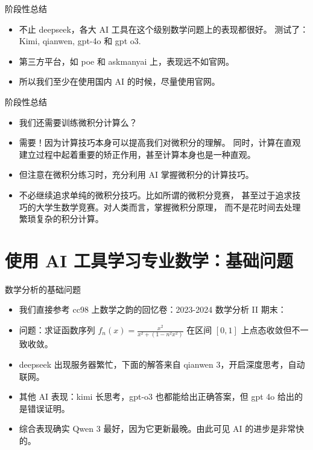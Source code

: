 \documentclass{beamer}
\begin{document}
\begin{frame}{阶段性总结}
\begin{itemize}
  \item<1-> 不止 deepseek，各大 AI 工具在这个级别数学问题上的表现都很好。
  测试了：Kimi, qianwen, gpt-4o 和 gpt o3.
  \item<2-> 第三方平台，如 poe 和 askmanyai 上，表现远不如官网。
  \item<3-> {\color{red}所以我们至少在使用国内 AI 的时候，尽量使用官网。}
\end{itemize}
\end{frame}

\begin{frame}{阶段性总结}
  \begin{itemize}
    \item<1-> 我们还需要训练微积分计算么？
    \item<2-> 需要！因为计算技巧本身可以提高我们对微积分的理解。
    同时，计算在直观建立过程中起着重要的矫正作用，甚至计算本身也是一种直观。
    \item<3-> 但注意在微积分练习时，充分利用 AI 掌握微积分的计算技巧。
    \item<4-> 不必继续追求单纯的微积分技巧。比如所谓的微积分竞赛，
    甚至过于追求技巧的大学生数学竞赛。对人类而言，掌握微积分原理，
    而不是花时间去处理繁琐复杂的积分计算。
  \end{itemize}
\end{frame}

\section{使用 AI 工具学习专业数学：基础问题}

\begin{frame}{数学分析的基础问题}
  \begin{itemize}
    \item<1-> 我们直接参考 cc98 上数学之韵的回忆卷：2023-2024 数学分析 II 期末：
    \item<2-> 问题：求证函数序列 $f_n(x) = \frac{x^2}{x^2 + (1 - n^2x^2)}$ 在区间 $[0,1]$ 上点态收敛但不一致收敛。
    \item<3-> deepseek 出现服务器繁忙，下面的解答来自 qianwen 3，开启深度思考，自动联网。
    \item<4-> 其他 AI 表现：kimi 长思考，gpt-o3 也都能给出正确答案，但 gpt 4o 给出的是错误证明。
    \item<5-> 综合表现确实 Qwen 3 最好，因为它更新最晚。由此可见 AI 的进步是非常快的。
  \end{itemize}
\end{frame}
\end{document}

